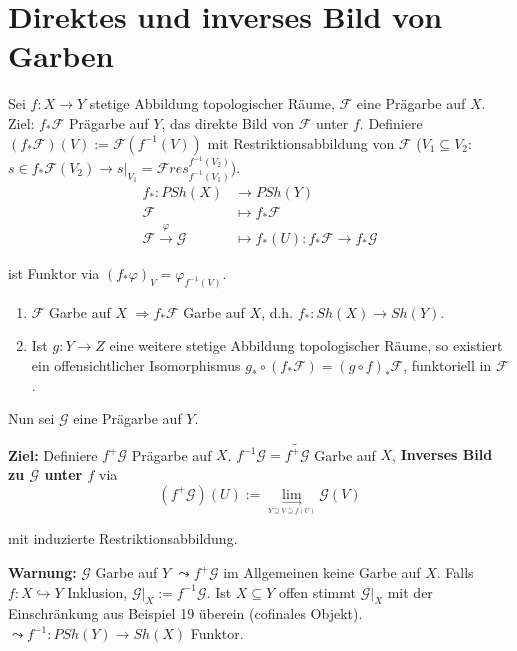 \section{Direktes und inverses Bild von Garben}
\label{sec:garben-direktes-inverses-bild}

Sei $f:X\rightarrow Y$ stetige Abbildung topologischer Räume, $\mathcal{F}$
eine Prägarbe auf $X$. Ziel: $f_{\ast}\mathcal{F}$ Prägarbe auf
$Y$, das direkte Bild von $\mathcal{F}$ unter $f$. Definiere $(f_{\ast}\mathcal{F})(V):=\mathcal{F}(f^{-1}(V))$
mit Restriktionsabbildung von $\mathcal{F}$ ($V_{1}\subseteq V_{2}:$
$s\in f_{\ast}\mathcal{F}(V_{2})\rightarrow s|_{V_{1}}=\mathcal{F}res_{f^{-1}(V_{1})}^{f^{-1}(V_{2})}$).
\begin{align*}
  f_{\ast}:PSh(X) & \longrightarrow PSh(Y)\\
  \mathcal{F} & \longmapsto f_{\ast}\mathcal{F}\\
  \mathcal{F}\overset{\varphi}{\rightarrow}\mathcal{G} & \longmapsto f_{\ast}(U):f_{\ast}\mathcal{F}\rightarrow f_{\ast}\mathcal{G}
\end{align*}

ist Funktor via $(f_{\ast}\varphi)_{V}=\varphi_{f^{-1}(V)}$.
\begin{rem}[28]
  \mbox{}
  \begin{enumerate}
  \item $\mathcal{F}$ Garbe auf $X$ $\Longrightarrow f_{\ast}\mathcal{F}$
    Garbe auf $X$, d.h. $f_{\ast}:Sh(X)\rightarrow Sh(Y)$.
  \item Ist $g:Y\rightarrow Z$ eine weitere stetige Abbildung topologischer
    Räume, so existiert ein offensichtlicher Isomorphismus $g_{\ast}\circ(f_{\ast}\mathcal{F})=(g\circ f)_{\ast}\mathcal{F}$,
    funktoriell in $\mathcal{F}$.
  \end{enumerate}
  \medskip{}
\end{rem}

Nun sei $\mathcal{G}$ eine Prägarbe auf $Y$.

\textbf{Ziel:} Definiere $f^{+}\mathcal{G}$ Prägarbe auf $X$. $f^{-1}\mathcal{G}=\widetilde{f^{+}\mathcal{G}}$
Garbe auf $X$, \textbf{Inverses Bild zu $\mathcal{G}$ unter $f$}
via 
\[
(f^{+}\mathcal{G})(U):=\underset{\underset{Y\supseteq V\supseteq f(U)}{\longrightarrow}}{\lim}\mathcal{G}(V)
\]

mit induzierte Restriktionsabbildung.\medskip{}

\textbf{Warnung:} $\mathcal{G}$ Garbe auf $Y$ $\leadsto f^{+}\mathcal{G}$
im Allgemeinen keine Garbe auf $X$. Falls $f:X\hookrightarrow Y$
Inklusion, $\mathcal{G}|_{X}:=f^{-1}\mathcal{G}$. Ist $X\subseteq Y$
offen stimmt $\mathcal{G}|_{X}$ mit der Einschränkung aus Beispiel
19 überein (cofinales Objekt). $\leadsto f^{-1}:PSh(Y)\rightarrow Sh(X)$
Funktor.

